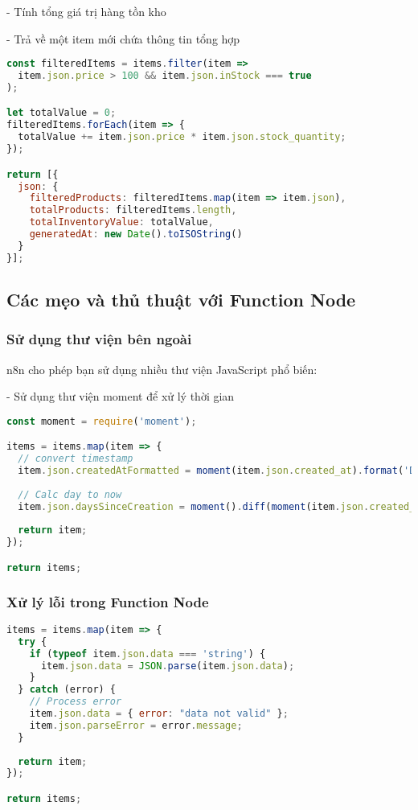 - Tính tổng giá trị hàng tồn kho

- Trả về một item mới chứa thông tin tổng hợp

\begin{lstlisting}[language=JavaScript]
const filteredItems = items.filter(item => 
  item.json.price > 100 && item.json.inStock === true
);

let totalValue = 0;
filteredItems.forEach(item => {
  totalValue += item.json.price * item.json.stock_quantity;
});

return [{
  json: {
    filteredProducts: filteredItems.map(item => item.json),
    totalProducts: filteredItems.length,
    totalInventoryValue: totalValue,
    generatedAt: new Date().toISOString()
  }
}];
\end{lstlisting}

\subsection{Các mẹo và thủ thuật với Function Node}

\subsubsection{Sử dụng thư viện bên ngoài}

n8n cho phép bạn sử dụng nhiều thư viện JavaScript phổ biến:

- Sử dụng thư viện moment để xử lý thời gian

\begin{lstlisting}[language=JavaScript]
const moment = require('moment');

items = items.map(item => {
  // convert timestamp 
  item.json.createdAtFormatted = moment(item.json.created_at).format('DD/MM/YYYY HH:mm');
  
  // Calc day to now
  item.json.daysSinceCreation = moment().diff(moment(item.json.created_at), 'days');
  
  return item;
});

return items;
\end{lstlisting}

\subsubsection{Xử lý lỗi trong Function Node}

\begin{lstlisting}[language=JavaScript]
items = items.map(item => {
  try {
    if (typeof item.json.data === 'string') {
      item.json.data = JSON.parse(item.json.data);
    }
  } catch (error) {
    // Process error
    item.json.data = { error: "data not valid" };
    item.json.parseError = error.message;
  }
  
  return item;
});

return items;
\end{lstlisting}


